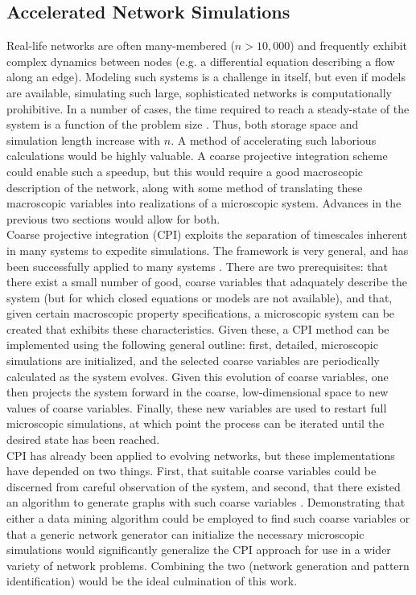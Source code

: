 \documentclass[11pt]{article}
\begin{document}
\subsection{Accelerated Network Simulations}
Real-life networks are often many-membered ($n>10,000$) and frequently exhibit complex dynamics between nodes (e.g. a differential equation describing a flow along an edge). Modeling such systems is a challenge in itself, but even if models are available, simulating such large, sophisticated networks is computationally prohibitive. In a number of cases, the time required to reach a steady-state of the system is a function of the problem size \cite{votingmodel1} \cite{votingmodel2} \cite{prefattach}. Thus, both storage space and simulation length increase with $n$. A method of accelerating such laborious calculations would be highly valuable. A coarse projective integration scheme could enable such a speedup, but this would require a good macroscopic description of the network, along with some method of translating these macroscopic variables into realizations of a microscopic system. Advances in the previous two sections would allow for both.\vspace{1mm}\\
Coarse projective integration (CPI) exploits the separation of timescales inherent in many systems to expedite simulations. The framework is very general, and has been successfully applied to many systems \cite{cpi papers}. There are two prerequisites: that there exist a small number of good, coarse variables that adaquately describe the system (but for which closed equations or models are not available), and that, given certain macroscopic property specifications, a microscopic system can be created that exhibits these characteristics. Given these, a CPI method can be implemented using the following general outline: first, detailed, microscopic simulations are initialized, and the selected coarse variables are periodically calculated as the system evolves. Given this evolution of coarse variables, one then projects the system forward in the coarse, low-dimensional space to new values of coarse variables. Finally, these new variables are used to restart full microscopic simulations, at which point the process can be iterated until the desired state has been reached. \vspace{1mm}\\
CPI has already been applied to evolving networks, but these implementations have depended on two things. First, that suitable coarse variables could be discerned from careful observation of the system, and second, that there existed an algorithm to generate graphs with such coarse variables \cite{bold and karthik} \cite{kathik prl}. Demonstrating that either a data mining algorithm could be employed to find such coarse variables or that a generic network generator can initialize the necessary microscopic simulations would significantly generalize the CPI approach for use in a wider variety of network problems. Combining the two (network generation and pattern identification) would be the ideal culmination of this work. \\ \\
\end{document}
